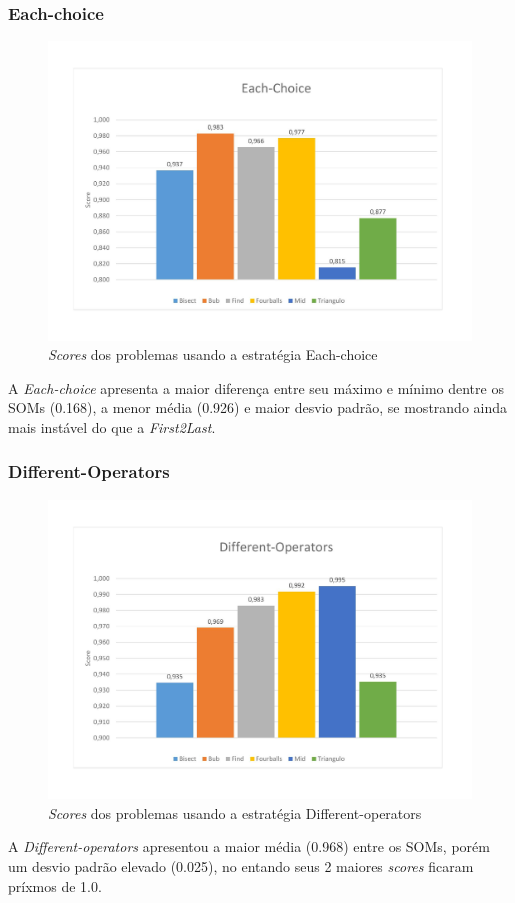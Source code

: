 \subsubsection{Each-choice}
\begin{figure}[H]
\includegraphics[width=1\textwidth]{graficos/strategies/each-choice.jpg}
\caption{\textit{Scores} dos problemas usando a estratégia Each-choice}
\label{fig:each-choice}
\end{figure}
A \textit{Each-choice} apresenta a maior diferença entre seu máximo e mínimo dentre os SOMs (0.168), a menor média (0.926) e maior desvio padrão, se mostrando ainda mais instável do que a \textit{First2Last}.

\subsubsection{Different-Operators}
\begin{figure}[H]
\includegraphics[width=1\textwidth]{graficos/strategies/different-operators.jpg}
\caption{\textit{Scores} dos problemas usando a estratégia Different-operators}
\label{fig:differente-operators}
\end{figure}
A \textit{Different-operators} apresentou a maior média (0.968) entre os SOMs, porém um desvio padrão elevado (0.025), no entando seus 2 maiores \textit{scores} ficaram príxmos de 1.0.

